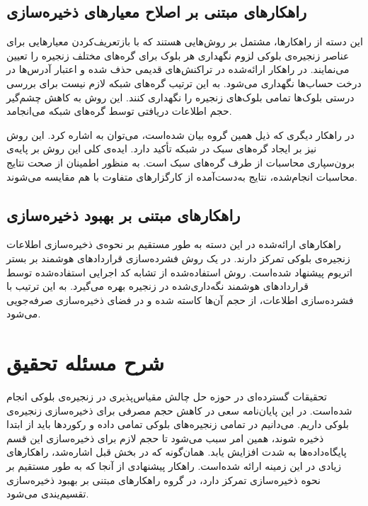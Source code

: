 \subsection{راهکارهای مبتنی بر اصلاح معیارهای ذخیره‌سازی}
این دسته از راهکارها، مشتمل بر روش‌هایی هستند که با بازتعریف‌کردن معیارهایی برای عناصر زنجیره‌‌ی بلوکی لزوم نگهداری هر بلوک برای گره‌های مختلف زنجیره را تعیین می‌نمایند. در راهکار ارائه‌شده در \cite{Bruce2017} تراکنش‌های قدیمی حذف شده و اعتبار آدرس‌ها در درخت حساب‌ها نگهداری می‌شود. به این ترتیب گره‌های شبکه لازم نیست برای بررسی درستی بلوک‌ها تمامی بلوک‌های زنجیره را نگهداری کنند. این روش به کاهش چشم‌گیر حجم اطلاعات دریافتی توسط گره‌های شبکه می‌انجامد. 

در راهکار دیگری که ذیل همین گروه بیان شده‌است، ‌می‌توان به \cite{VanDenHooff2014} اشاره کرد. این روش نیز بر ایجاد گره‌های سبک در شبکه تأکید دارد. ایده‌ی کلی این روش بر پایه‌ی برون‌سپاری محاسبات از طرف گره‌های سبک است. به منظور اطمینان از صحت نتایج محاسبات انجام‌شده، نتایج به‌دست‌آمده از کارگزارهای متفاوت با هم مقایسه می‌شوند.

\subsection{راهکارهای مبتنی بر بهبود ذخیره‌سازی}
راهکارهای ارائه‌شده در این دسته به طور مستقیم بر نحوه‌ی ذخیره‌سازی اطلاعات زنجیره‌ی بلوکی تمرکز دارند. در \cite{Pontiveros2018} یک روش فشرده‌سازی قراردادهای هوشمند بر بستر اتریوم پیشنهاد شده‌است. روش استفاده‌شده از تشابه کد اجرایی استفاده‌شده توسط قراردادهای هوشمند نگه‌داری‌شده در زنجیره بهره می‌گیرد. به این ترتیب با فشرده‌سازی اطلاعات، از حجم آن‌ها کاسته شده و در فضای ذخیره‌سازی صرفه‌جویی می‌شود.

\section{شرح مسئله تحقیق}
تحقیقات گسترده‌ای در حوزه حل چالش مقیاس‌پذیری در زنجیره‌ی بلوکی انجام شده‌است. در این پایان‌نامه سعی در کاهش حجم مصرفی برای ذخیره‌سازی زنجیره‌ی بلوکی داریم. می‌دانیم در تمامی زنجیره‌های بلوکی تمامی داده و رکوردها باید از ابتدا ذخیره شوند، همین امر سبب می‌شود تا حجم لازم برای ذخیره‌سازی این قسم پایگاه‌داده‌ها به شدت افزایش یابد. همان‌گونه که در بخش قبل اشاره‌شد، راهکارهای زیادی در این زمینه ارائه شده‌است. راهکار پیشنهادی از آنجا که به طور مستقیم بر نحوه ذخیره‌سازی تمرکز دارد، در گروه راهکارهای مبتنی بر بهبود ذخیره‌سازی تقسیم‌یندی می‌شود. 

